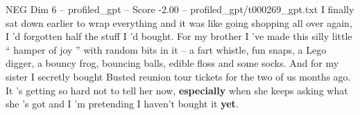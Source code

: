 \begin{textsample}{NEG Dim 6 – profiled\_gpt – Score -2.00 – profiled\_gpt/t000269\_gpt.txt}  \label{ex:f6_neg_020}
I finally sat down earlier to wrap everything and it was like going shopping all over again, I ’d forgotten half the stuff I ’d bought.
For my brother I ’ve made this silly little “ hamper of joy ” with random bits in it – a fart whistle, fun snaps, a Lego digger, a bouncy frog, bouncing balls, edible floss and some socks.
And for my sister I secretly bought Busted reunion tour tickets for the two of us months ago.
It ’s getting so hard not to tell her now, \textbf{especially} when she keeps asking what she ’s got and I ’m pretending I haven't bought it \textbf{yet}.

\end{textsample}
